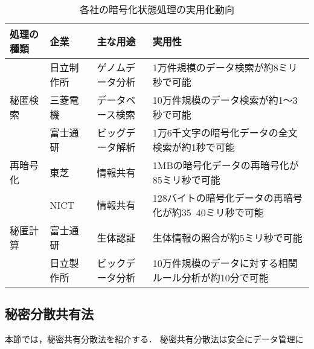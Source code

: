 \begin{table}[htbp]
  \begin{center}
    \small{
    \begin{tabular}{llll}
      \hline
      処理の種類 & 企業 & 主な用途 & 実用性\\
      \hline
      & 日立制作所 & ゲノムデータ分析 & 1万件規模のデータ検索が約8ミリ秒で可能 \cite{hitachi}\\
      秘匿検索 & 三菱電機 & データベース検索 & 10万件規模のデータ検索が約1〜3秒で可能 \cite{mitubisi}\\
      & 富士通研 & ビッグデータ解析 & 1万6千文字の暗号化データの全文検索が約1秒で可能\cite{fujitsu}\\
      \hline
      再暗号化 & 東芝 & 情報共有 & 1MBの暗号化データの再暗号化が85ミリ秒で可能 \\
      & NICT & 情報共有 & 128バイトの暗号化データの再暗号化が約35~40ミリ秒で可能\cite{nict}\\
      \hline
      秘匿計算 & 富士通研 & 生体認証 & 生体情報の照合が約5ミリ秒で可能\cite{fujitsu}\\
      & 日立製作所 & ビックデータ分析 & 10万件規模のデータに対する相関ルール分析が約10分で可能 \cite{hitachi}\\
      \hline
    \end{tabular}
    \label{tab:real}
    \caption{各社の暗号化状態処理の実用化動向}
  }
  \end{center}
\end{table}


\subsection{秘密分散共有法}
本節では，秘密共有分散法を紹介する．
秘密共有分散法は安全にデータ管理に
